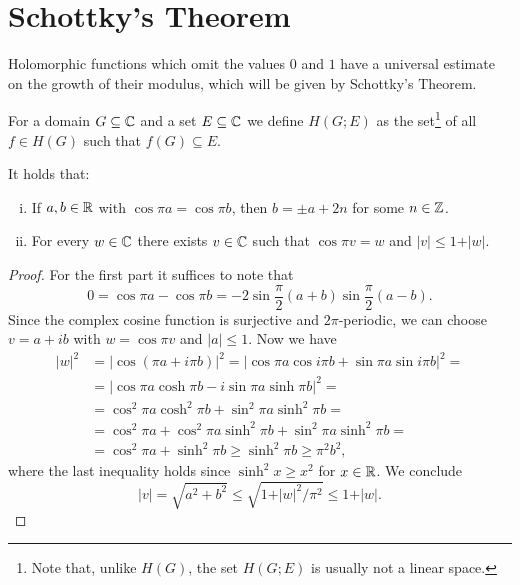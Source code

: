 \section{Schottky's Theorem}
\label{sec:schottkys-theorem}

Holomorphic functions which omit the values $0$ and $1$ have a universal estimate on the growth of their modulus, which will be given by Schottky's Theorem.

For a domain $G \subseteq \mathbb{C}$ and a set $E \subseteq \mathbb{C}$ we define $H(G; E)$ as the set\footnote{Note that, unlike $H(G)$, the set $H(G; E)$ is usually not a linear space.} of all $f \in H(G)$ such that $f(G) \subseteq E$.

\begin{lemma} \label{lem:schottky-1}
    It holds that:
    \begin{enumerate}[i.]
        \item If $a, b \in \mathbb{R}$ with $\cos \pi a = \cos \pi b$, then $b = \pm a + 2n$ for some $n \in \mathbb{Z}$.
        \item For every $w \in \mathbb{C}$ there exists $v \in \mathbb{C}$ such that $\cos \pi v = w$ and $\vert v \vert \leq 1 + \vert w \vert$.
    \end{enumerate}
\end{lemma}

\begin{proof}
    For the first part it suffices to note that
    $$ 0 = \cos \pi a - \cos \pi b = \textstyle -2 \sin \frac{\pi}{2} ( a + b ) \sin \frac{\pi}{2} ( a - b ). $$
    Since the complex cosine function is surjective and $2 \pi$-periodic, we can choose $v = a + i b$ with $w = \cos \pi v$ and $\vert a \vert \leq 1$. Now we have
    \begin{align*}
        \vert w \vert^2 &= \vert \cos (\pi a + i \pi b) \vert^2 = \vert \cos \pi a \cos i \pi b + \sin \pi a \sin i \pi b \vert^2 = \\
        &= \vert \cos \pi a \cosh \pi b - i \sin \pi a \sinh \pi b \vert^2 = \\
        &= \cos^2 \pi a \cosh^2 \pi b + \sin^2 \pi a \sinh^2 \pi b = \\
        &= \cos^2 \pi a + \cos^2 \pi a \sinh^2 \pi b + \sin^2 \pi a \sinh^2 \pi b = \\
        &= \cos^2 \pi a + \sinh^2 \pi b \geq \sinh^2 \pi b \geq \pi^2 b^2,
    \end{align*}
    where the last inequality holds since $\sinh^2 x \geq x^2$ for $x \in \mathbb{R}$. We conclude
    \begin{equation*}
        \vert v \vert = \sqrt{a^2 + b^2} \leq \sqrt{1 + \vert w \vert^2 / \pi^2} \leq 1 + \vert w \vert.
    \end{equation*}
\end{proof}

